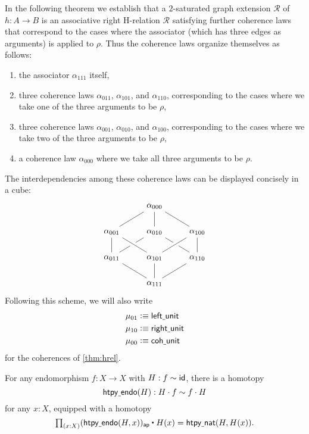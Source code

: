 In the following theorem we establish that a $2$-saturated graph extension $\mathcal{R}$ of $h:A\to B$ is an associative right H-relation $\mathcal{R}$ satisfying further coherence laws that correspond to the cases where the associator (which has three edges as arguments) is applied to $\rho$. Thus the coherence laws organize themselves as follows:
\begin{enumerate}
\item the associator $\alpha_{111}$ itself,
\item three coherence laws $\alpha_{011}$, $\alpha_{101}$, and $\alpha_{110}$, corresponding to the cases where we take one of the three arguments to be $\rho$,
\item three coherence laws $\alpha_{001}$, $\alpha_{010}$, and $\alpha_{100}$, corresponding to the cases where we take two of the three arguments to be $\rho$,
\item a coherence law $\alpha_{000}$ where we take all three arguments to be $\rho$.
\end{enumerate}
The interdependencies among these coherence laws can be displayed concisely in a cube:
\begin{equation*}
\begin{tikzcd}
& \alpha_{000} \arrow[dl,-] \arrow[d,-] \arrow[dr,-] \\
\alpha_{001} \arrow[d,-] & \alpha_{010} \arrow[dl,-] \arrow[dr,-] & \alpha_{100} \arrow[d,-] \\
\alpha_{011} \arrow[dr,-] & \alpha_{101} \arrow[d,-] \arrow[from=ul,crossing over,-] \arrow[from=ur,crossing over,-] & \alpha_{110} \arrow[dl,-] \\
& \alpha_{111}
\end{tikzcd}
\end{equation*}
Following this scheme, we will also write
\begin{align*}
\mu_{01} & \vcentcolon\equiv \mathsf{left\underline{\ }{}unit} \\
\mu_{10} & \vcentcolon\equiv \mathsf{right\underline{\ }{}unit} \\
\mu_{00} & \vcentcolon\equiv \mathsf{coh\underline{\ }{}unit}
\end{align*}
for the coherences of \autoref{thm:hrel}.

\begin{defn}
For any endomorphism $f:X\to X$ with $H:f\sim \mathsf{id}_{}$, there is a homotopy
\begin{equation*}
\mathsf{htpy\underline{\ }{}endo}(H): H\cdot f \sim f\cdot H
\end{equation*}
for any $x:X$, equipped with a homotopy
\begin{equation*}
\prd{x:X} \ct{(\mathsf{htpy\usc{}endo}(H,x))_{\mathsf{ap}}}{H(x)}=\mathsf{htpy\usc{}nat}(H,H(x)).
\end{equation*}
\end{defn}

